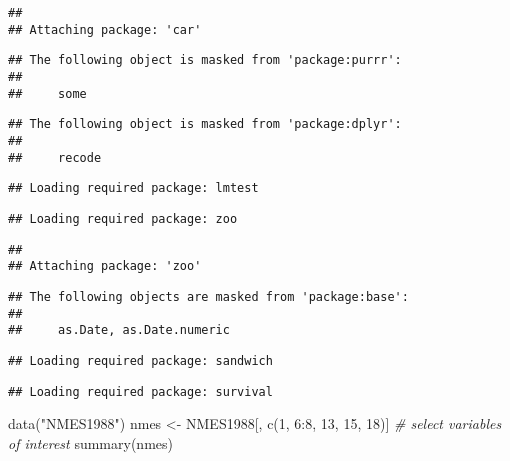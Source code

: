 \documentclass[
  oneside]{book}
\newenvironment{Shaded}{\begin{snugshade}}{\end{snugshade}}
\newcommand{\CommentTok}[1]{\textcolor[rgb]{0.56,0.35,0.01}{\textit{#1}}}
\newcommand{\DecValTok}[1]{\textcolor[rgb]{0.00,0.00,0.81}{#1}}
\newcommand{\FunctionTok}[1]{\textcolor[rgb]{0.00,0.00,0.00}{#1}}
\newcommand{\NormalTok}[1]{#1}
\newcommand{\OtherTok}[1]{\textcolor[rgb]{0.56,0.35,0.01}{#1}}
\newcommand{\SpecialCharTok}[1]{\textcolor[rgb]{0.00,0.00,0.00}{#1}}
\newcommand{\StringTok}[1]{\textcolor[rgb]{0.31,0.60,0.02}{#1}}
\begin{document}
\begin{verbatim}
## 
## Attaching package: 'car'
\end{verbatim}

\begin{verbatim}
## The following object is masked from 'package:purrr':
## 
##     some
\end{verbatim}

\begin{verbatim}
## The following object is masked from 'package:dplyr':
## 
##     recode
\end{verbatim}

\begin{verbatim}
## Loading required package: lmtest
\end{verbatim}

\begin{verbatim}
## Loading required package: zoo
\end{verbatim}

\begin{verbatim}
## 
## Attaching package: 'zoo'
\end{verbatim}

\begin{verbatim}
## The following objects are masked from 'package:base':
## 
##     as.Date, as.Date.numeric
\end{verbatim}

\begin{verbatim}
## Loading required package: sandwich
\end{verbatim}

\begin{verbatim}
## Loading required package: survival
\end{verbatim}

\begin{Shaded}
\begin{Highlighting}[]
\FunctionTok{data}\NormalTok{(}\StringTok{"NMES1988"}\NormalTok{)}
\NormalTok{nmes }\OtherTok{\textless{}{-}}\NormalTok{ NMES1988[, }\FunctionTok{c}\NormalTok{(}\DecValTok{1}\NormalTok{, }\DecValTok{6}\SpecialCharTok{:}\DecValTok{8}\NormalTok{, }\DecValTok{13}\NormalTok{, }\DecValTok{15}\NormalTok{, }\DecValTok{18}\NormalTok{)] }\CommentTok{\# select variables of interest}
\FunctionTok{summary}\NormalTok{(nmes)}
\end{Highlighting}
\end{Shaded}
\end{document}
